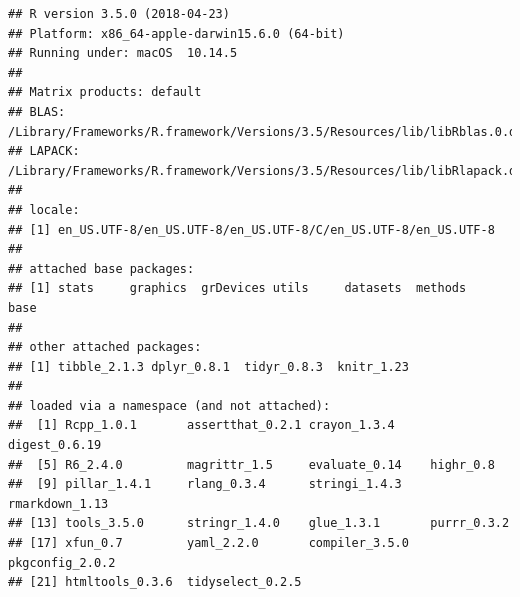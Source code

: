 \documentclass[]{article}
\begin{document}
\begin{verbatim}
## R version 3.5.0 (2018-04-23)
## Platform: x86_64-apple-darwin15.6.0 (64-bit)
## Running under: macOS  10.14.5
## 
## Matrix products: default
## BLAS: /Library/Frameworks/R.framework/Versions/3.5/Resources/lib/libRblas.0.dylib
## LAPACK: /Library/Frameworks/R.framework/Versions/3.5/Resources/lib/libRlapack.dylib
## 
## locale:
## [1] en_US.UTF-8/en_US.UTF-8/en_US.UTF-8/C/en_US.UTF-8/en_US.UTF-8
## 
## attached base packages:
## [1] stats     graphics  grDevices utils     datasets  methods   base     
## 
## other attached packages:
## [1] tibble_2.1.3 dplyr_0.8.1  tidyr_0.8.3  knitr_1.23  
## 
## loaded via a namespace (and not attached):
##  [1] Rcpp_1.0.1       assertthat_0.2.1 crayon_1.3.4     digest_0.6.19   
##  [5] R6_2.4.0         magrittr_1.5     evaluate_0.14    highr_0.8       
##  [9] pillar_1.4.1     rlang_0.3.4      stringi_1.4.3    rmarkdown_1.13  
## [13] tools_3.5.0      stringr_1.4.0    glue_1.3.1       purrr_0.3.2     
## [17] xfun_0.7         yaml_2.2.0       compiler_3.5.0   pkgconfig_2.0.2 
## [21] htmltools_0.3.6  tidyselect_0.2.5
\end{verbatim}
\end{document}
